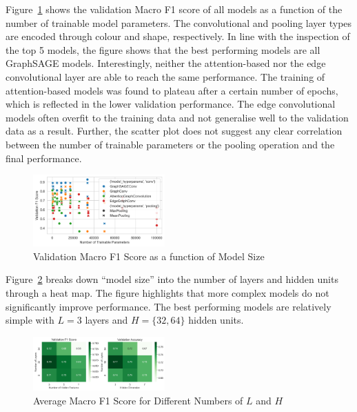 \documentclass[10pt,conference,compsocconf]{ieee}
\begin{document}
Figure~\ref{fig:scatter-val-f1} shows the validation Macro F1 score of all
models as a function of the number of trainable model parameters. The
convolutional and pooling layer types are encoded through colour and shape,
respectively. In line with the inspection of the top 5 models, the figure shows
that the best performing models are all GraphSAGE models. Interestingly, neither
the attention-based nor the edge convolutional layer are able to reach the same
performance. The training of attention-based models was found to plateau after a
certain number of epochs, which is reflected in the lower validation
performance. The edge convolutional models often overfit to the training data
and not generalise well to the validation data as a result. Further, the
scatter plot does not suggest any clear correlation between the number of
trainable parameters or the pooling operation and the final performance.

\begin{figure}[ht]
  \centering
  \includegraphics[width=0.45\textwidth]{../plots/scatter-val-f1.png}
  \caption{Validation Macro F1 Score as a function of Model Size}
  \label{fig:scatter-val-f1}
\end{figure}

Figure~\ref{fig:perf_vs_layers} breaks down ``model size'' into the number of
layers and hidden units through a heat map. The figure highlights that more
complex models do not significantly improve performance. The best performing
models are relatively simple with $L=3$ layers and $H=\{32, 64\}$ hidden units.

\begin{figure}[ht]
  \centering
  \includegraphics[width=0.45\textwidth]{../plots/heat-val-f1-acc.png}
  \caption{Average Macro F1 Score for Different Numbers of $L$ and $H$}
  \label{fig:perf_vs_layers}
\end{figure}
\end{document}
